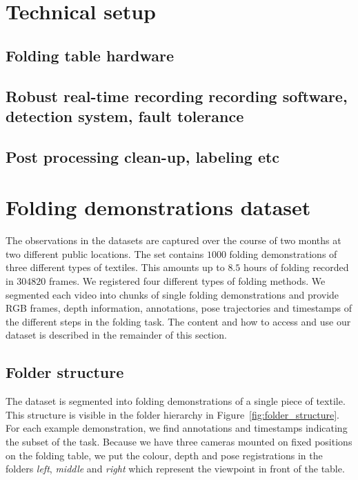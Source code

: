 \documentclass[\home/main.tex]{subfiles}
\begin{document}
\section{Technical setup}
\subsection{Folding table {\tiny hardware}}
\subsection{Robust real-time recording {\tiny recording software, detection system, fault tolerance}}
\subsection{Post processing {\tiny clean-up, labeling etc}}
\section{Folding demonstrations dataset}

The observations in the datasets are captured over the course of two months at two different public locations. The set contains $1000$ folding demonstrations of three different types of textiles. This amounts up to $8.5$ hours of folding recorded in $304820$ frames. We registered four different types of folding methods. We segmented each video into chunks of single folding demonstrations and provide RGB frames, depth information, annotations, pose trajectories and timestamps of the different steps in the folding task. The content and how to access and use our dataset is described in the remainder of this section.  

\subsection{Folder structure}
The dataset is segmented into folding demonstrations of a single piece of textile. This structure is visible in the folder hierarchy in Figure~\ref{fig:folder_structure}. For each example demonstration, we find annotations and timestamps indicating the subset of the task. Because we have three cameras mounted on fixed positions on the folding table, we put the colour, depth and pose registrations in the folders \textit{left}, \textit{middle} and \textit{right} which represent the viewpoint in front of the table. 
\end{document}
